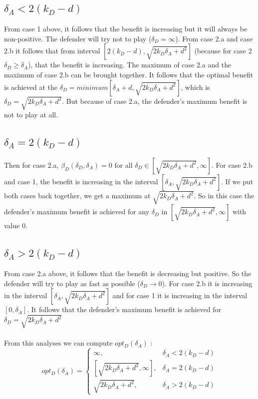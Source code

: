 \subsection*{$\delta_{A} < 2(k_{D} - d)$}
From case 1 above, it follows that the benefit is increasing but it will always be non-positive. The defender will try not to play ($\delta_{D}= \infty$). From case 2.a and case 2.b it follows that from interval $[2(k_{D} -d), \sqrt{2k_{D}\delta_{A} + d^{2}}]$  (because for case 2 $\delta_{D} \geq \delta_{A}$), that the benefit is increasing.  The maximum of case 2.a and the maximum of case 2.b can be brought together. It follows that the optimal benefit is achieved at the $\delta_{D}=minimum[\delta_{A} + d, \sqrt{2k_{D}\delta_{A} + d^{2}}]$, which is $\delta_{D}=\sqrt{2k_{D}\delta_{A} + d^{2}}$. But because of case 2.a, the defender's maximum benefit is not to play at all.

\subsection*{$\delta_{A} = 2(k_{D} - d)$}
Then for case 2.a, $\beta_{D}(\delta_{D}, \delta_{A})=0$ for  all $\delta_{D} \in [\sqrt{2k_{D}\delta_{A} + d^{2}}, \infty]$. For case 2.b and case 1, the benefit is increasing in the interval $[\delta_{A},\sqrt{2k_{D}\delta_{A} + d^{2}}]$. If we put both cases back together, we get a maximum at $\sqrt{2k_{D}\delta_{A} + d^{2}}$. So in this case the defender's maximum benefit is achieved for any $\delta_{D}$ in $[\sqrt{2k_{D}\delta_{A} + d^{2}}, \infty]$ with value 0.

\subsection*{$\delta_{A} > 2(k_{D} - d)$ }
From case 2.a above, it follows that the benefit is decreasing but positive. So the defender will try to play as fast as possible ($\delta_{D} \rightarrow 0$). For case 2.b it is increasing in the interval $[ \delta_{A} ,\sqrt{2k_{D}\delta_{A} + d^{2}}]$ and for case 1 it is increasing in the interval $[0,\delta_{A}]$. It follows that the defender's maximum benefit is achieved for $\delta_{D} = \sqrt{2k_{D}\delta_{A} + d^{2}} $  \\


~~\\
From this analyses we can compute $opt_{D}(\delta_{A})$ : \\

 \begin{displaymath}
  opt_{D}(\delta_{A}) = \left\{
     \begin{array}{lr}
          \infty , & \delta_{A} < 2(k_{D} - d)\\
      \left[ \sqrt{2k_{D}\delta_{A} + d^{2}},\infty\right] , & \delta_{A} = 2(k_{D} - d) \\
      \sqrt{2k_{D}\delta_{A} + d^{2}}, & \delta_{A} > 2(k_{D} - d)
     \end{array}
   \right.
\end{displaymath}

